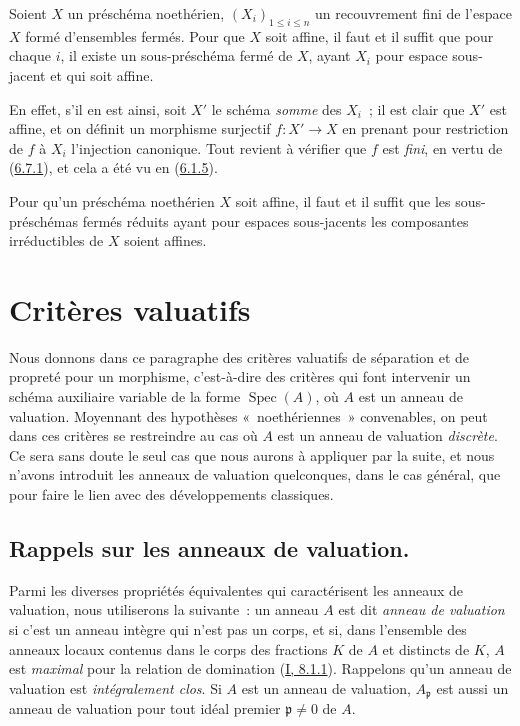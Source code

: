 \begin{corollary}[6.7.2]
\label{II.6.7.2-fr}
Soient $X$ un préschéma noethérien, $(X_i)_{1\leq i\leq n}$ un recouvrement
fini de l'espace $X$ formé d'ensembles fermés. Pour que $X$ soit affine, il
faut et il suffit que pour chaque $i$, il existe un sous-préschéma fermé de
$X$, ayant $X_i$ pour espace sous-jacent et qui soit affine.
\end{corollary}

En effet, s'il en est ainsi, soit $X'$ le schéma \emph{somme} des $X_i$~; il
est clair que $X'$ est affine, et on définit un morphisme surjectif
$f:X'\to X$ en prenant pour restriction de $f$ à $X_i$ l'injection
canonique. Tout revient à vérifier que $f$ est \emph{fini}, en vertu de
(\hyperref[II.6.7.1-fr]{6.7.1}), et cela a été vu en
(\hyperref[II.6.1.5-fr]{6.1.5}).

\begin{corollary}[6.7.3]
\label{II.6.7.3-fr}
Pour qu'un préschéma noethérien $X$ soit affine, il faut et il suffit que les
sous-préschémas fermés réduits ayant pour espaces sous-jacents les composantes
irréductibles de $X$ soient affines.
\end{corollary}

\section{Critères valuatifs}
\label{section:II.7-fr}

Nous donnons dans ce paragraphe des critères valuatifs de séparation et de
propreté pour un morphisme, c'est-à-dire des critères qui font intervenir un
schéma auxiliaire variable de la forme $\operatorname{Spec}(A)$, où $A$ est
un anneau de valuation. Moyennant des hypothèses «~noethériennes~»
convenables, on peut dans ces critères se restreindre au cas où $A$ est un
anneau de valuation \emph{discrète}. Ce sera sans doute le seul cas que nous
aurons à appliquer par la suite, et nous n'avons introduit les anneaux de
valuation quelconques, dans le cas général, que pour faire le lien avec des
développements classiques.

\subsection{Rappels sur les anneaux de valuation.}
\label{subsection:II.7.1-fr}

\begin{env}[7.1.1]
\label{II.7.1.1-fr}
Parmi les diverses propriétés équivalentes qui caractérisent les anneaux de
valuation, nous utiliserons la suivante~: un anneau $A$ est dit
\emph{anneau de valuation} si c'est un anneau intègre qui n'est pas un
corps, et si, dans l'ensemble des anneaux locaux contenus dans le corps des
fractions $K$ de $A$ et distincts de $K$, $A$ est \emph{maximal} pour la
relation de domination (\hyperref[I.8.1.1-fr]{I, 8.1.1}). Rappelons qu'un
anneau de valuation est \emph{intégralement clos}. Si $A$ est un anneau de
valuation, $A_{\mathfrak{p}}$ est aussi un anneau de valuation pour tout
idéal premier $\mathfrak{p}\neq0$ de $A$.
\end{env}

